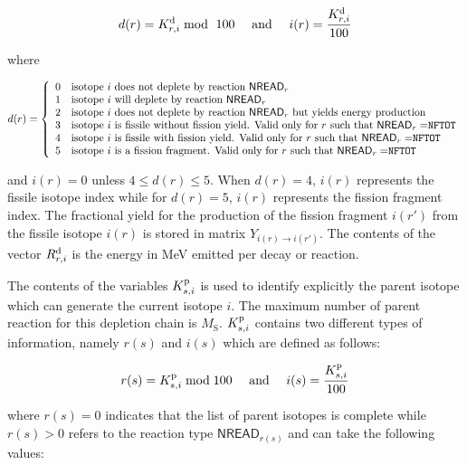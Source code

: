 \begin{equation}
  d(r)=K_{r,i}^{\rm d} \bmod \ 100 \ \ \ \ {\rm and} \ \ \ \ i(r)={K_{r,i}^{\rm d}  \over 100}
\end{equation}

\noindent where

\begin{displaymath}
d(r) = \left\{
\begin{array}{ll}
0 & \textrm{isotope $i$ does not deplete by reaction $\mathsf{NREAD}_{r}$} \\
1 & \textrm{isotope $i$ will deplete by reaction $\mathsf{NREAD}_{r}$} \\
2 & \textrm{isotope $i$ does not deplete by reaction $\mathsf{NREAD}_{r}$ but yields energy production} \\
3 & \textrm{isotope $i$ is fissile without fission yield. Valid only for $r$ such
that $\mathsf{NREAD}_{r}=${\tt NFTOT}} \\
4 & \textrm{isotope $i$ is fissile with fission yield. Valid only for $r$ such
that $\mathsf{NREAD}_{r}=${\tt NFTOT}} \\
5 & \textrm{isotope $i$ is a fission fragment. Valid only for $r$ such
that $\mathsf{NREAD}_{r}=${\tt NFTOT}}
\end{array} \right.
\end{displaymath}

\noindent and $i(r)=0$ unless $4\le d(r)\le 5$. When $d(r)=4$, $i(r)$ represents the fissile
isotope index while for $d(r)=5$, $i(r)$ represents the fission fragment index.
The fractional yield for the production of the fission fragment $i(r')$ from the
fissile isotope $i(r)$ is stored in matrix $Y_{i(r)\to i(r')}$.
The contents of the vector $R_{r,i}^{\rm d}$ is the energy in MeV emitted per
decay or reaction.

\vskip 0.2cm

The contents of the variables $K_{s,i}^{\rm p}$ is used to identify explicitly the parent isotope
which can generate the current isotope $i$. The maximum number of parent reaction for this
depletion chain is $M_{\mathrm{S}}$. $K_{s,i}^{\rm p}$ contains two different types of information,
namely $r(s)$ and $i(s)$ which are defined as follows:

\begin{equation}
  r(s)=K_{s,i}^{\rm p}\bmod 100 \ \ \ \ {\rm and} \ \ \ \ i(s)={{K_{s,i}^{\rm p}}\over{100}}
\end{equation}

\noindent where $r(s)=0$ indicates that the list of parent isotopes is complete while $r(s)>0$
refers to the reaction type $\mathsf{NREAD}_{r(s)}$ and can take the following values:

